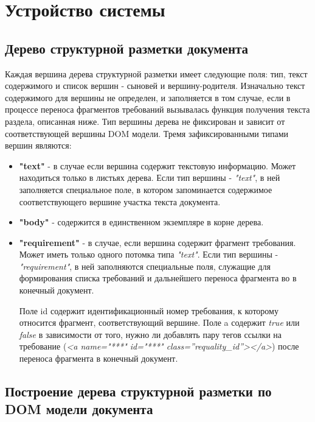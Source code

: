 \section{Устройство системы}
\label{sec:Chapter4} 

\subsection{Дерево структурной разметки документа}

Каждая вершина дерева структурной разметки имеет следующие поля: тип, текст содержимого и список вершин - сыновей и вершину-родителя. Изначально текст содержимого для вершины не определен, и заполняется в том случае, если в процессе переноса фрагментов требований вызывалась функция получения текста раздела, описанная ниже. Тип вершины дерева не фиксирован и зависит от соответствующей вершины DOM модели. Тремя зафиксированными типами вершин являются: 

\begin{itemize}

\item \textbf{"text"} - в случае если вершина содержит текстовую информацию. Может находиться только в листьях дерева. Если тип вершины - \emph{"text"}, в ней заполняется специальное поле, в котором запоминается содержимое соответствующего вершине участка текста документа.

\item \textbf{"body"} - содержится в единственном экземпляре в корне дерева.

\item \textbf{"requirement"} - в случае, если вершина содержит фрагмент требования. Может иметь только одного потомка типа \emph{"text"}. Если тип вершины - \emph{"requirement"}, в ней заполняются специальные поля, служащие для формирования списка требований и дальнейшего переноса фрагмента во в конечный документ.

Поле id содержит идентификационный номер требования, к которому относится фрагмент, соответствующий вершине. Поле a содержит \emph{true} или \emph{false} в зависимости от того, нужно ли добавлять пару тегов ссылки на требование \newline(\emph{<a name="***" id="***" class=”requality\_id”></a>}) после переноса фрагмента в конечный документ. 

\end{itemize}

\subsection{Построение дерева структурной разметки по DOM модели документа}

